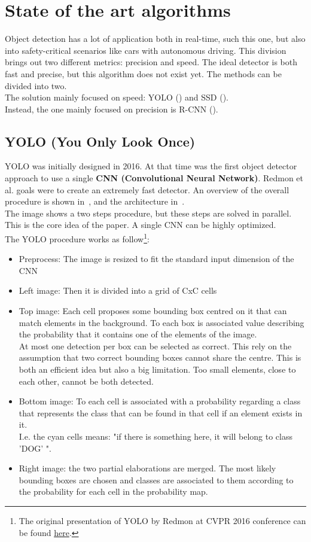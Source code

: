 \section{State of the art algorithms}
Object detection has a lot of application both in real-time, such this one, but also into safety-critical scenarios like cars with autonomous driving. This division brings out two different metrics: precision and speed. The ideal detector is both fast and precise, but this algorithm does not exist yet. The methods can be divided into two.\\
The solution mainly focused on speed: YOLO () and SSD ().\\
Instead, the one mainly focused on precision is R-CNN ().


\subsection{YOLO (You Only Look Once)} \label{sec:yolo}
YOLO\cite{yolo} was initially designed in 2016. At that time was the first object detector approach to use a single \textbf{CNN (Convolutional Neural Network)}. Redmon et al. goals were to create an extremely fast detector. An overview of the overall procedure is shown in~, and the architecture in~.\\
The image shows a two steps procedure, but these steps are solved in parallel. This is the core idea of the paper. A single CNN can be highly optimized.\\
The YOLO procedure works as follow\footnote{The original presentation of YOLO by Redmon at CVPR 2016 conference can be found \href{https://www.youtube.com/watch?v=NM6lrxy0bxs}{here}.}:
\begin{itemize}
	\item Preprocess: The image is resized to fit the standard input dimension of the CNN
	\item Left image: Then it is divided into a grid of CxC cells
	\item Top image: Each cell proposes some bounding box centred on it that can match elements in the background. To each box is associated value describing the probability that it contains one of the elements of the image.\\
	At most one detection per box can be selected as correct. This rely on the assumption that two correct bounding boxes cannot share the centre. This is both an efficient idea but also a big limitation. Too small elements, close to each other, cannot be both detected.
	\item Bottom image: To each cell is associated with a probability regarding a class that represents the class that can be found in that cell if an element exists in it.\\
	I.e. the cyan cells means: "if there is something here, it will belong to class 'DOG' ".
	\item Right image: the two partial elaborations are merged. The most likely bounding boxes are chosen and classes are associated to them according to the probability for each cell in the probability map.
\end{itemize}

